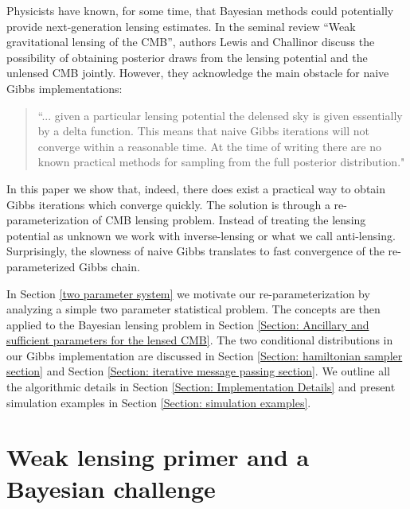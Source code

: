 \documentclass[noinfoline]{imsart}
\begin{document}
Physicists have known, for some time, that Bayesian methods could potentially provide next-generation lensing estimates. In the seminal review ``Weak gravitational lensing of the CMB'', authors Lewis and Challinor \cite{Lewis20061} discuss the possibility of obtaining posterior draws from the lensing potential and the unlensed CMB jointly. However, they acknowledge the main obstacle for naive Gibbs implementations:
\begin{quote}
``... given a particular lensing potential the delensed sky is given essentially by a delta function.
This means that naive Gibbs iterations will not converge within a reasonable time. At the time of writing there are no known practical methods for sampling from the full posterior distribution."
\end{quote}
In this paper we show that, indeed, there does exist a practical way to obtain Gibbs iterations which converge quickly. The solution is through a re-parameterization of CMB lensing problem. Instead of treating the lensing potential as unknown we work with inverse-lensing or what we call anti-lensing. Surprisingly, the slowness of naive Gibbs translates to fast convergence of the re-parameterized Gibbs chain. 



In Section \ref{two parameter system} we motivate our re-parameterization by analyzing a simple two parameter statistical problem.  The concepts are then applied to the Bayesian lensing problem in Section \ref{Section: Ancillary and sufficient parameters for the lensed CMB}. The two conditional distributions in our Gibbs implementation are discussed in Section \ref{Section: hamiltonian sampler section} and Section \ref{Section: iterative message passing section}. We outline all the algorithmic details in Section \ref{Section: Implementation Details} and present simulation examples in Section \ref{Section: simulation examples}.




%
%
\section{Weak lensing primer and a Bayesian challenge}
\label{primer}
\end{document}
